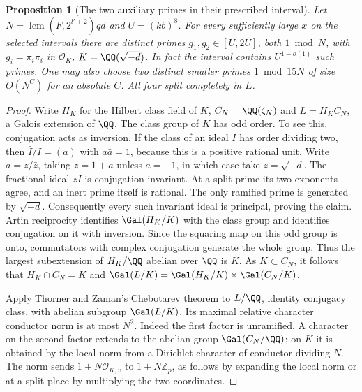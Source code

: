 \documentclass[a4paper,11pt]{article}
\newtheorem{proposition}{Proposition}[section]
\theoremstyle{definition}
\theoremstyle{remark}
\newcommand{\ZZ}{\mathbb Z}\newcommand{\ord}{\operatorname{ord}}
\numberwithin{equation}{section}
\begin{document}
\begin{proposition}[The two auxiliary primes in their prescribed interval]\label{prop:ray50}
Let \(N=\operatorname{lcm}(F,2^{l'+2})qd\) and \(U=(kb)^8\).
For every sufficiently large \(x\) on the selected intervals there
are distinct primes \(g_1,g_2\in[U,2U]\), both \(1\bmod N\), with
\(g_i=\pi_i\bar\pi_i\) in \(\mathcal O_K\), \(K=\QQ(\sqrt{-d})\).
In fact the interval contains \(U^{1-o(1)}\) such primes. One may
also choose two distinct smaller primes \(1\bmod 15N\) of size
\(O(N^{C})\) for an absolute \(C\). All four split completely in \(E\).
\end{proposition}
\begin{proof}
Write \(H_K\) for the Hilbert class field of \(K\), \(C_N=\QQ(\zeta_N)\)
and \(L=H_K C_N\), a Galois extension of \(\QQ\). The class group of
\(K\) has odd order. To see this, conjugation acts as inversion. If the
class of an ideal \(I\) has order dividing two, then \(\bar I/I=(a)\)
with \(a\bar a=1\), because this is a positive rational unit. Write
\(a=z/\bar z\), taking \(z=1+a\) unless \(a=-1\), in which case take
\(z=\sqrt{-d}\). The fractional ideal \(zI\) is conjugation invariant.
At a split prime its two exponents agree, and an inert prime itself is
rational. The only ramified prime is generated by \(\sqrt{-d}\).
Consequently every such invariant ideal is principal, proving the claim.
Artin reciprocity identifies \(\Gal(H_K/K)\) with the class group and
identifies conjugation on it with inversion. Since the squaring map on
this odd group is onto, commutators with complex conjugation generate
the whole group. Thus the largest subextension of \(H_K/\QQ\) abelian
over \(\QQ\) is \(K\). As \(K\subset C_N\), it follows that
\(H_K\cap C_N=K\) and
\(\Gal(L/K)=\Gal(H_K/K)\times\Gal(C_N/K)\).

Apply Thorner and Zaman's Chebotarev theorem to \(L/\QQ\), identity
conjugacy class, with abelian subgroup \(\Gal(L/K)\).
Its maximal relative character conductor norm is at most \(N^2\).
Indeed the first factor is unramified. A character on the second
factor extends to the abelian group \(\Gal(C_N/\QQ)\); on \(K\) it
is obtained by the local norm from a Dirichlet character of conductor
dividing \(N\). The norm sends \(1+N\mathcal O_{K,v}\) to
\(1+N\ZZ_p\), as follows by expanding the local norm or at a split
place by multiplying the two coordinates.


\end{proof}
\end{document}

